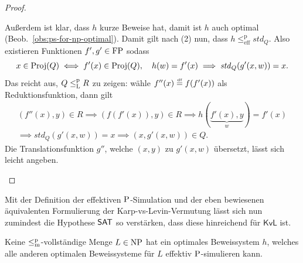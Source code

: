 \begin{proof}
\begin{prooflist}
    Außerdem ist klar, dass $h$ kurze Beweise hat, damit ist $h$ auch optimal (Beob.~\ref{obs:ps-for-np-optimal}). %
    Damit gilt nach (2) nun, dass $h\leq^\mathrm p_\mathrm{eff} \mathit{std}_Q$. Also existieren Funktionen $f',g'\in\FP$ sodass
    \[ x\in \Proj(Q)\iff f'(x)\in\Proj(Q),\quad h(w)=f'(x) \implies \mathit{std}_Q(g'(x,w))=x. \]%
    Das reicht aus, $Q\leqlp R$ zu zeigen: wähle $f''(x)\defeq f(f'(x))$ als Reduktionsfunktion, dann gilt
    \begin{gather*}
        (f''(x), y)\in R \implies (f(f'(x)), y)\in R \implies h(\underbrace{f'(x),y}_{w})=f'(x) \\
    \implies \mathit{std}_Q(g'(x,w))=x \implies (x,g'(x,w))\in Q. \end{gather*}
    Die Translationsfunktion $g''$, welche $(x,y)$ zu $g'(x,w)$ übersetzt, lässt sich leicht angeben.
\end{prooflist}
\end{proof}

Mit der Definition der effektiven $\P$-Simulation und der eben bewiesenen äquivalenten Formulierung der Karp-vs-Levin-Vermutung lässt sich nun zumindest die Hypothese $\hSAT$ so verstärken, dass diese hinreichend für $\mathsf{KvL}$ ist.


\begin{conjecture}
    Keine $\leqmp$-vollständige Menge $L\in\NP$ hat ein optimales Beweissystem $h$, welches alle anderen optimalen Beweissysteme für $L$ effektiv $\P$-simulieren kann. 
\end{conjecture}

%


